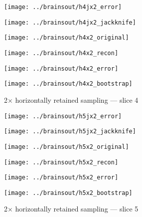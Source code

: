 \documentclass[review,supplement,onefignum,onetabnum,juq]{siamonline181217}
\begin{document}
\begin{figure}
\begin{centering}

\parbox{\imsize}{\texttt{[image: ../brainsout/h4jx2\_error]}}
\parbox{\imsize}{\texttt{[image: ../brainsout/h4jx2\_jackknife]}}

\vspace{\vertsep}

\parbox{\imsize}{\texttt{[image: ../brainsout/h4x2\_original]}}
\parbox{\imsize}{\texttt{[image: ../brainsout/h4x2\_recon]}}

\vspace{\vertsep}

\parbox{\imsize}{\texttt{[image: ../brainsout/h4x2\_error]}}
\parbox{\imsize}{\texttt{[image: ../brainsout/h4x2\_bootstrap]}}

\end{centering}
\caption{2$\times$ horizontally retained sampling --- slice 4}
\end{figure}


\begin{figure}
\begin{centering}

\parbox{\imsize}{\texttt{[image: ../brainsout/h5jx2\_error]}}
\parbox{\imsize}{\texttt{[image: ../brainsout/h5jx2\_jackknife]}}

\vspace{\vertsep}

\parbox{\imsize}{\texttt{[image: ../brainsout/h5x2\_original]}}
\parbox{\imsize}{\texttt{[image: ../brainsout/h5x2\_recon]}}

\vspace{\vertsep}

\parbox{\imsize}{\texttt{[image: ../brainsout/h5x2\_error]}}
\parbox{\imsize}{\texttt{[image: ../brainsout/h5x2\_bootstrap]}}

\end{centering}
\caption{2$\times$ horizontally retained sampling --- slice 5}
\end{figure}
\end{document}
